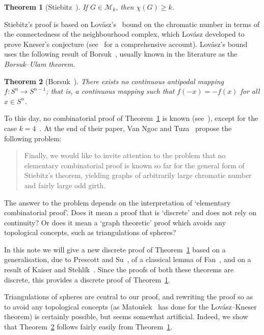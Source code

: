 \documentclass[11pt,a4paper]{amsart}
\newtheorem{theorem}{Theorem}[section]
\begin{document}
\begin{theorem}[Stiebitz~\cite{Sti85}]
\label{thm:stiebitz}
  If $G \in \mathcal M_k$, then $\chi(G) \geq k$.
\end{theorem}

Stiebitz's proof is based on Lov\'asz's~\cite{Lov78} bound on the chromatic
number in terms of the connectedness of the neighbourhood complex, which
Lov\'asz developed to prove Kneser's conjecture (see~\cite{Mat03} for a
comprehensive account). Lov\'asz's bound uses the following result of
Borsuk~\cite{Bor33}, usually known in the literature as the
\emph{Borsuk--Ulam theorem}.
\begin{theorem}[Borsuk~\cite{Bor33}]
\label{thm:borsuk-ulam}
  There exists no continuous antipodal mapping $f:S^n \to S^{n-1}$; that is,
  a continuous mapping such that $f(-x)=-f(x)$ for all $x \in S^n$.
\end{theorem}

To this day, no combinatorial proof of Theorem~\ref{thm:stiebitz} is known
(see~\cite[pp.~133]{Mat03}), except for the case $k=4$~\cite{VNT95}. At the
end of their paper, Van Ngoc and Tuza~\cite{VNT95} propose the following problem:
\begin{quote}\small
  Finally, we would like to invite attention to the problem that no elementary
  combinatorial proof is known so far for the general form of Stiebitz's theorem,
  yielding graphs of arbitrarily large chromatic number and fairly large odd girth.
\end{quote}

The answer to the problem depends on the interpretation of `elementary combinatorial
proof'. Does it mean a proof that is `discrete' and does not rely on continuity?
Or does it mean a `graph theoretic' proof which avoids any topological concepts,
such as triangulations of spheres? 

In this note we will give a new discrete proof of Theorem~\ref{thm:stiebitz} based
on a generalisation, due to Prescott and Su~\cite{PS05}, of a classical lemma of
Fan~\cite{Fan52}, and on a result of Kaiser and Stehl\'ik~\cite{KS15}. Since the
proofs of both these theorems are discrete, this provides a discrete proof of
Theorem~\ref{thm:stiebitz}.

Triangulations of spheres are central to our proof, and rewriting the proof
so as to avoid any topological concepts (as Matou\v sek~\cite{Mat04} has done for the
Lov\'asz--Kneser theorem) is certainly possible, but seems somewhat artificial.
Indeed, we show that Theorem~\ref{thm:borsuk-ulam} follows fairly easily from
Theorem~\ref{thm:stiebitz}.
\end{document}
